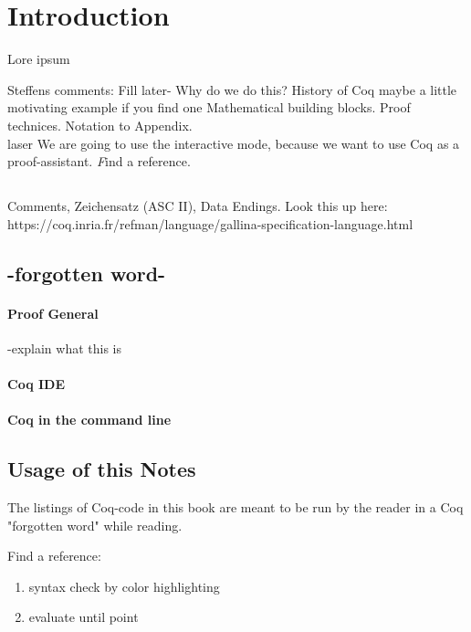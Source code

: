 \section{Introduction}



Lore ipsum \cite{PACGGHSY}

Steffens comments:
Fill later-
 Why do we do this?
 History of Coq
 maybe a little motivating example if you find one
 Mathematical building blocks. Proof technices. Notation to Appendix.\\
 \gls{laser}
We are going to use the interactive mode, because we want to use Coq as a proof-assistant. {\emph Find a reference.}

\subsection{}

Comments, Zeichensatz (ASC II), Data Endings.
Look this up here:\\
https://coq.inria.fr/refman/language/gallina-specification-language.html
\subsection{-forgotten word-}



\paragraph{Proof General}
-explain what this is


\paragraph{Coq IDE}

\paragraph{Coq in the command line}




\subsection{Usage of this Notes}


The listings of Coq-code in this book are meant to be run by the reader in a Coq "forgotten word" while reading.

Find a reference:
\begin{enumerate}
\item syntax check by color highlighting
\item evaluate until point
\end{enumerate}




